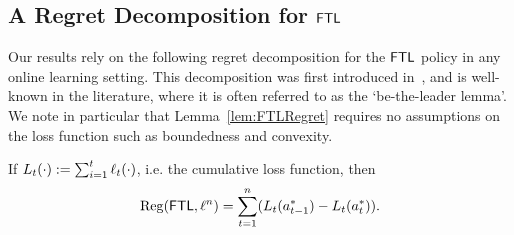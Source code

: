 \subsection{A Regret Decomposition for $\mathsf{FTL}$} 
\label{ssec:FTL}

Our results rely on the following regret decomposition for the $\mathsf{FTL}$ policy in any online learning setting. This decomposition was first introduced in~\cite[Section 3]{kalai2005efficient}, and is well-known in the literature, where it is often referred to as the `be-the-leader lemma'.  We note in particular that Lemma~\ref{lem:FTLRegret} requires no assumptions on the loss function such as boundedness and convexity. 

\begin{lemma} \label{lem:FTLRegret}
If $L_t(\cdot) \mathrel{\mathop{:}}= \sum_{i=1}^t \ell_t(\cdot)$, i.e. the cumulative loss function, then
\begin{align} \label{eq:FTLRegEquality}
    \mathrm{Reg}(\mathsf{FTL}, \ell^n) = \sum_{t=1}^n (L_t(a^*_{t-1}) - L_t(a^*_t)). 
\end{align}
\end{lemma}

